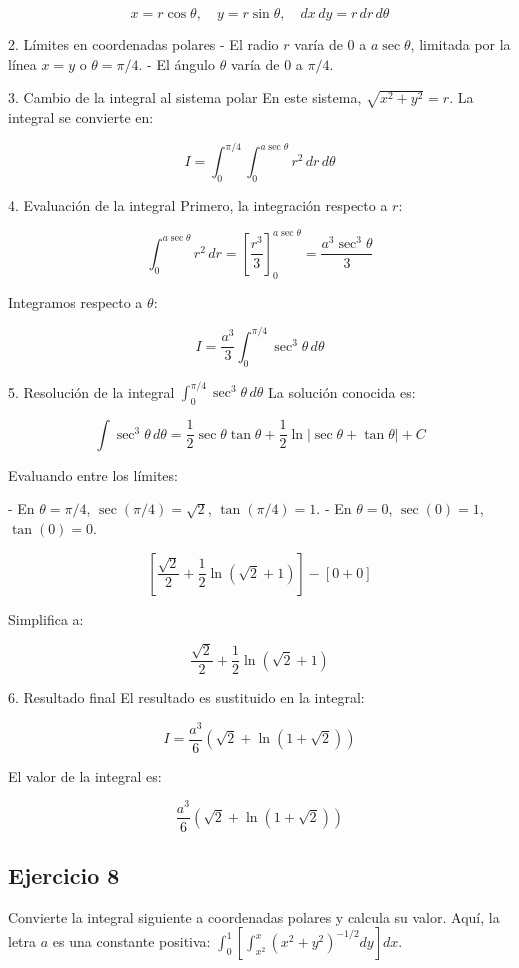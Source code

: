 \documentclass{report}
\begin{document}
\[
x = r \cos \theta, \quad y = r \sin \theta, \quad dx \, dy = r \, dr \, d\theta
\]

2. Límites en coordenadas polares  
- El radio \(r\) varía de \(0\) a \(a \sec \theta\), limitada por la línea \(x = y\) o \(\theta = \pi/4\).
- El ángulo \(\theta\) varía de \(0\) a \(\pi/4\).

3. Cambio de la integral al sistema polar  
En este sistema, \( \sqrt{x^2 + y^2} = r \). La integral se convierte en:

\[
I = \int_0^{\pi/4} \int_0^{a \sec \theta} r^2 \, dr \, d\theta
\]

4. Evaluación de la integral  
Primero, la integración respecto a \(r\):

\[
\int_0^{a \sec \theta} r^2 \, dr = \left[ \frac{r^3}{3} \right]_0^{a \sec \theta} = \frac{a^3 \sec^3 \theta}{3}
\]

Integramos respecto a \(\theta\):

\[
I = \frac{a^3}{3} \int_0^{\pi/4} \sec^3 \theta \, d\theta
\]

5. Resolución de la integral \( \int_0^{\pi/4} \sec^3 \theta \, d\theta \)  
La solución conocida es:

\[
\int \sec^3 \theta \, d\theta = \frac{1}{2} \sec \theta \tan \theta + \frac{1}{2} \ln |\sec \theta + \tan \theta| + C
\]

Evaluando entre los límites:

- En \( \theta = \pi/4 \), \( \sec(\pi/4) = \sqrt{2} \), \( \tan(\pi/4) = 1 \).
- En \( \theta = 0 \), \( \sec(0) = 1 \), \( \tan(0) = 0 \).

\[
\left[ \frac{\sqrt{2}}{2} + \frac{1}{2} \ln(\sqrt{2} + 1) \right] - \left[ 0 + 0 \right]
\]

Simplifica a:

\[
\frac{\sqrt{2}}{2} + \frac{1}{2} \ln(\sqrt{2} + 1)
\]

6. Resultado final  
El resultado es sustituido en la integral:

\[
I = \frac{a^3}{6} \left( \sqrt{2} + \ln(1 + \sqrt{2}) \right)
\]

El valor de la integral es:

\[
\boxed{\frac{a^3}{6} \left( \sqrt{2} + \ln(1 + \sqrt{2}) \right)}
\]\subsection{Ejercicio 8}
Convierte la integral siguiente a coordenadas polares y calcula su valor. Aquí, la letra $a$ es una constante positiva: \(\int_{0}^{1}\left[\int_{x^{2}}^{x}\left(x^{2}+y^{2}\right)^{-1 / 2} d y\right] d x\).
\end{document}
